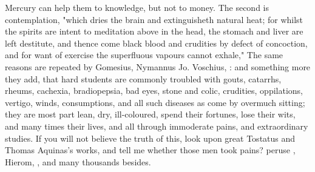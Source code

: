 Mercury can help them to knowledge, but not to money. The second is
contemplation, "which dries the brain and extinguisheth
natural heat; for whilst the spirits are intent to meditation above in the
head, the stomach and liver are left destitute, and thence come black blood and
crudities by defect of concoction, and for want of exercise the superfluous
vapours cannot exhale," \etc{} The same reasons are repeated by Gomesius,
 Nymannus
 Jo. Voschius, : and something more they add, that hard students are
commonly troubled with gouts, catarrhs, rheums, cachexia, bradiopepsia, bad
eyes, stone and colic, crudities, oppilations, vertigo,
winds, consumptions, and all such diseases as come by overmuch sitting; they
are most part lean, dry, ill-coloured, spend their fortunes, lose their wits,
and many times their lives, and all through immoderate pains, and extraordinary
studies. If you will not believe the truth of this, look upon great Tostatus
and Thomas Aquinas's works, and tell me whether those men took pains? peruse
\Austin{}, Hierom, \etc{}, and many thousands besides.

